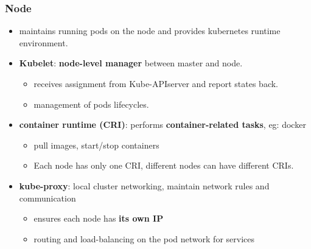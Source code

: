 \subsubsection{Node}
\begin{itemize}

	\item maintains running pods on the node and provides kubernetes runtime environment. 
	\item \textbf{Kubelet}: \textbf{node-level manager} between master and node. 
	\begin{itemize}
		\item receives assignment from Kube-APIserver and report states back.
		\item management of pods lifecycles.
	\end{itemize}
	\item \textbf{container runtime (CRI)}: performs \textbf{container-related tasks}, eg: docker
	\begin{itemize}
		\item pull images, start/stop containers
		\item Each node has only one CRI, different nodes can have different CRIs.
	\end{itemize} 
	\item \textbf{kube-proxy}: local cluster networking, maintain network rules and communication
	\begin{itemize}
		\item ensures each node has \textbf{its own IP}
		\item routing and load-balancing on the pod network for services
	\end{itemize}
\end{itemize}


